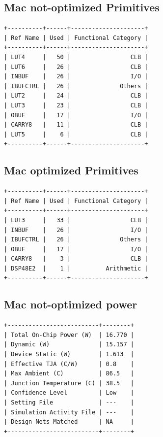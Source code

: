 \documentclass[11pt]{report}
\begin{document}
\subsection*{Mac not-optimized Primitives}
\small
\begin{lstlisting}
+----------+------+---------------------+
| Ref Name | Used | Functional Category |
+----------+------+---------------------+
| LUT4     |   50 |                 CLB |
| LUT6     |   26 |                 CLB |
| INBUF    |   26 |                 I/O |
| IBUFCTRL |   26 |              Others |
| LUT2     |   24 |                 CLB |
| LUT3     |   23 |                 CLB |
| OBUF     |   17 |                 I/O |
| CARRY8   |   11 |                 CLB |
| LUT5     |    6 |                 CLB |
+----------+------+---------------------+
\end{lstlisting}

\subsection*{Mac optimized Primitives}
\begin{lstlisting}
+----------+------+---------------------+
| Ref Name | Used | Functional Category |
+----------+------+---------------------+
| LUT3     |   33 |                 CLB |
| INBUF    |   26 |                 I/O |
| IBUFCTRL |   26 |              Others |
| OBUF     |   17 |                 I/O |
| CARRY8   |    3 |                 CLB |
| DSP48E2  |    1 |          Arithmetic |
+----------+------+---------------------+
\end{lstlisting}
\newpage


\subsection*{Mac not-optimized power}
\small
\begin{lstlisting}
+--------------------------+--------+
| Total On-Chip Power (W)  | 16.770 |
| Dynamic (W)              | 15.157 |
| Device Static (W)        | 1.613  |
| Effective TJA (C/W)      | 0.8    |
| Max Ambient (C)          | 86.5   |
| Junction Temperature (C) | 38.5   |
| Confidence Level         | Low    |
| Setting File             | ---    |
| Simulation Activity File | ---    |
| Design Nets Matched      | NA     |
+--------------------------+--------+
\end{lstlisting}
\end{document}
